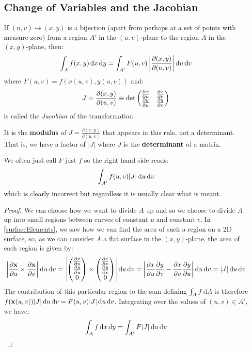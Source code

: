 \documentclass[../main.tex]{subfiles}
\begin{document}
\subsection{Change of Variables and the Jacobian}
\begin{proposition}
  If $(u, v) \mapsto (x, y)$ is a bijection (apart from perhaps at a set of points with measure zero) from a region $A'$ in the $(u, v)$-plane to the region $A$ in the $(x, y)$-plane, then:
  \label{areaCoV}
  \[
    \int_A f(x, y) \d{x} \d{y} = \int_{A'} F(u, v) \abs{\frac{\partial(x, y)}{\partial(u, v)}} \d{u}\d{v}
  \]
  where $F(u, v) = f(x(u, v), y(u, v))$ and:
  \[
    J = \frac{\partial(x, y)}{\partial(u, v)} \equiv \det \begin{pmatrix}
    \pderiv{x}{u} & \pderiv{x}{v} \\
    \pderiv{y}{u} & \pderiv{y}{v} \\
    \end{pmatrix}
  \]
  is called the \textit{Jacobian} of the transformation.
\end{proposition}
\begin{remark}[Note]
  It is the \textbf{modulus} of $J = \frac{\partial(x, y)}{\partial(u, v)}$ that appears in this rule, not a determinant.
  That is, we have a factor of $|J|$ where $J$ is the \textbf{determinant} of a matrix.
\end{remark}
\begin{remark}[Notation]
  We often just call $F$ just $f$ so the right hand side reads:
  \[
    \int_{A'} f(u, v) |J| \d{u} \d{v}
  \]
  which is clearly incorrect but regardless it is usually clear what is meant.
\end{remark}
\begin{proof}
  We can choose how we want to divide $A$ up and so we choose to divide $A$ up into small regions between curves of constant $u$ and constant $v$.
  In \cref{surfaceElements}, we saw how we can find the area of such a region on a 2D surface, so, as we can consider $A$ a flat surface in the $(x, y)$-plane, the area of each region is given by:
  \[
    \abs{\pderiv{\vec{x}}{u} \times \pderiv{\vec{x}}{v}} \d{u} \d{v} = \abs{\begin{pmatrix}
    \pderiv{x}{u} \\
    \pderiv{y}{u} \\
    0 \\
    \end{pmatrix} \times \begin{pmatrix}
    \pderiv{x}{v} \\
    \pderiv{y}{v} \\
    0 \\
    \end{pmatrix}} \d{u} \d{v} =
    \abs{\pderiv{x}{u}\pderiv{y}{v} - \pderiv{x}{v}\pderiv{y}{u}}\d{u}\d{v} = |J| \d{u}\d{v}
  \]
  The contribution of this particular region to the sum defining $\int_A f \d{A}$ is therefore $f(\vec{x}(u, v))|J| \d{u} \d{v} = F(u, v) |J| \d{u} \d{v}$.
  Integrating over the values of $(u, v) \in A'$, we have:
  \[
    \int_A f \d{x} \d{y} = \int_{A'} F |J|\d{u} \d{v}
  \]
\end{proof}
\end{document}
